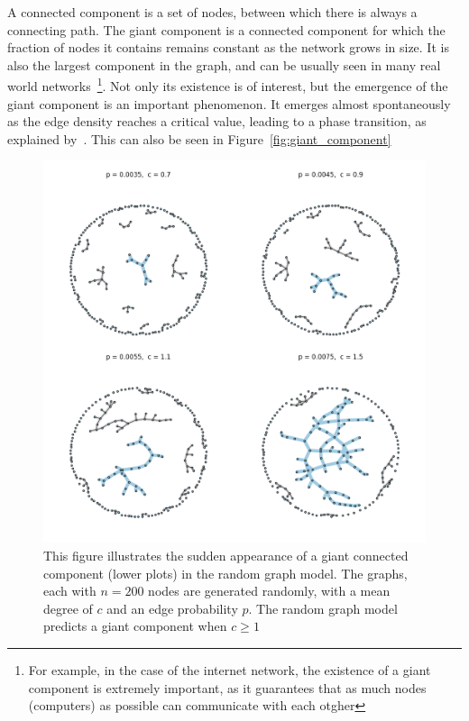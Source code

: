 \documentclass[12pt,beltcrest]{ociamthesis} %
\begin{document}
A connected component is a set of nodes, between which there is always a connecting path.
The giant component is a connected component for which the fraction of nodes it contains remains constant as the network grows in size.
It is also the largest component in the graph, and can be usually seen in many real world networks~\footnote{For example, in the case of the internet network, the existence of a giant component is extremely important, as it guarantees that as much nodes (computers) as possible can communicate with each otgher}.
Not only its existence is of interest, but the emergence of the giant component is an important phenomenon.
It emerges almost spontaneously as the edge density reaches a critical value, leading to a phase transition, as explained by~\cite{newman2002random}.
This can also be seen in Figure~\vref{fig:giant_component}
\begin{figure}[tb]
	\centering
	\includegraphics[width=13.5cm]{figures/giant_component.png}
	\caption[Sudden appearance of the giant component in a random graph]{This figure illustrates the sudden appearance of a giant connected component (lower plots) in the random graph model. The graphs, each with $n=200$ nodes are generated randomly, with a mean degree of $c$ and an edge probability $p$. The random graph model predicts a giant component when $c\ge1$}
	\label{fig:giant_component}
\end{figure}
\end{document}

